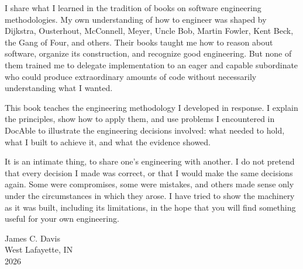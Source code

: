 I share what I learned in the tradition of books on software engineering methodologies. My own understanding of how to engineer was shaped by Dijkstra, Ousterhout, McConnell, Meyer, Uncle Bob, Martin Fowler, Kent Beck, the Gang of Four, and others. Their books taught me how to reason about software, organize its construction, and recognize good engineering. But none of them trained me to delegate implementation to an eager and capable subordinate who could produce extraordinary amounts of code without necessarily understanding what I wanted.

This book teaches the engineering methodology I developed in response. I explain the principles, show how to apply them, and use problems I encountered in DocAble to illustrate the engineering decisions involved: what needed to hold, what I built to achieve it, and what the evidence showed.

It is an intimate thing, to share one's engineering with another. I do not pretend that every decision I made was correct, or that I would make the same decisions again. Some were compromises, some were mistakes, and others made sense only under the circumstances in which they arose. I have tried to show the machinery as it was built, including its limitations, in the hope that you will find something useful for your own engineering.


James C. Davis\\
West Lafayette, IN\\
2026
